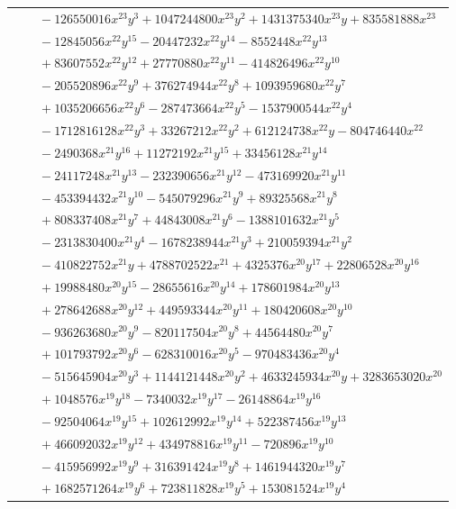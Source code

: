 \documentclass[11pt]{article}
\begin{document}
\begin{longtable}{@{}ll@{}}
 & $\quad -126550016x^{23}y^{3}+1047244800x^{23}y^{2}+1431375340x^{23}y+835581888x^{23}$\\
 & $\quad -12845056x^{22}y^{15}-20447232x^{22}y^{14}-8552448x^{22}y^{13}$\\
 & $\quad +83607552x^{22}y^{12}+27770880x^{22}y^{11}-414826496x^{22}y^{10}$\\
 & $\quad -205520896x^{22}y^{9}+376274944x^{22}y^{8}+1093959680x^{22}y^{7}$\\
 & $\quad +1035206656x^{22}y^{6}-287473664x^{22}y^{5}-1537900544x^{22}y^{4}$\\
 & $\quad -1712816128x^{22}y^{3}+33267212x^{22}y^{2}+612124738x^{22}y-804746440x^{22}$\\
 & $\quad -2490368x^{21}y^{16}+11272192x^{21}y^{15}+33456128x^{21}y^{14}$\\
 & $\quad -24117248x^{21}y^{13}-232390656x^{21}y^{12}-473169920x^{21}y^{11}$\\
 & $\quad -453394432x^{21}y^{10}-545079296x^{21}y^{9}+89325568x^{21}y^{8}$\\
 & $\quad +808337408x^{21}y^{7}+44843008x^{21}y^{6}-1388101632x^{21}y^{5}$\\
 & $\quad -2313830400x^{21}y^{4}-1678238944x^{21}y^{3}+210059394x^{21}y^{2}$\\
 & $\quad -410822752x^{21}y+4788702522x^{21}+4325376x^{20}y^{17}+22806528x^{20}y^{16}$\\
 & $\quad +19988480x^{20}y^{15}-28655616x^{20}y^{14}+178601984x^{20}y^{13}$\\
 & $\quad +278642688x^{20}y^{12}+449593344x^{20}y^{11}+180420608x^{20}y^{10}$\\
 & $\quad -936263680x^{20}y^{9}-820117504x^{20}y^{8}+44564480x^{20}y^{7}$\\
 & $\quad +101793792x^{20}y^{6}-628310016x^{20}y^{5}-970483436x^{20}y^{4}$\\
 & $\quad -515645904x^{20}y^{3}+1144121448x^{20}y^{2}+4633245934x^{20}y+3283653020x^{20}$\\
 & $\quad +1048576x^{19}y^{18}-7340032x^{19}y^{17}-26148864x^{19}y^{16}$\\
 & $\quad -92504064x^{19}y^{15}+102612992x^{19}y^{14}+522387456x^{19}y^{13}$\\
 & $\quad +466092032x^{19}y^{12}+434978816x^{19}y^{11}-720896x^{19}y^{10}$\\
 & $\quad -415956992x^{19}y^{9}+316391424x^{19}y^{8}+1461944320x^{19}y^{7}$\\
 & $\quad +1682571264x^{19}y^{6}+723811828x^{19}y^{5}+153081524x^{19}y^{4}$\\

\end{longtable}
\end{document}
